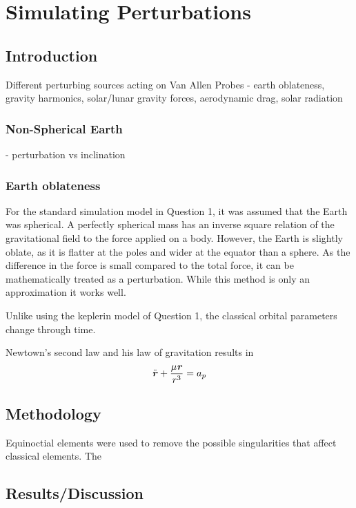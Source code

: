 \documentclass[Space3_Assign1.tex]{subfiles}
\begin{document}
\section{Simulating Perturbations}

\subsection{Introduction}
Different perturbing sources acting on Van Allen Probes - earth oblateness, gravity harmonics, solar/lunar gravity forces, aerodynamic drag, solar radiation\\

\subsubsection{Non-Spherical Earth}
- perturbation vs inclination


\subsubsection{Earth oblateness}
For the standard simulation model in Question 1, it was assumed that the Earth was spherical. A perfectly spherical mass has an inverse square relation of the gravitational field to the force applied on a body. However, the Earth is slightly oblate, as it is flatter at the poles and wider at the equator than a sphere. As the difference in the force is small compared to the total force, it can be mathematically treated as a perturbation. While this method is only an approximation it works well.

Unlike using the keplerin model of Question 1, the classical orbital parameters change through time.


Newtown's second law and his law of gravitation results in 
\begin{eqnarray}
\ddot{\textbf{\textit{r}}}+\frac{\mu\textbf{\textit{r}}}{r^3} = a_p
\end{eqnarray}

\subsection{Methodology}
Equinoctial elements were used to remove the possible singularities that affect classical elements. The 



\subsection{Results/Discussion}
\end{document}
